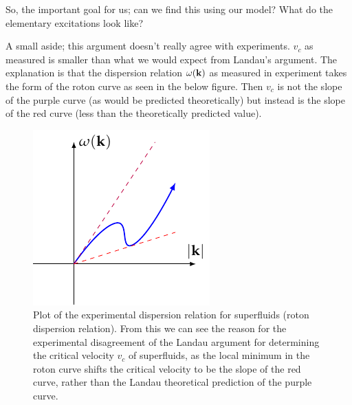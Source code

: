 So, the important goal for us; can we find this using our model? What do the elementary excitations look like?

A small aside; this argument doesn't really agree with experiments. $v_c$ as measured is smaller than what we would expect from Landau's argument. The explanation is that the dispersion relation $\omega(\mathbf{k})$ as measured in experiment takes the form of the roton curve as seen in the below figure. Then $v_c$ is not the slope of the purple curve (as would be predicted theoretically) but instead is the slope of the red curve (less than the theoretically predicted value).

\begin{figure}[htbp]
    \centering
    \includegraphics[]{Images/fig-rotoncurve.pdf}

    \caption{Plot of the experimental dispersion relation for superfluids (roton dispersion relation). From this we can see the reason for the experimental disagreement of the Landau argument for determining the critical velocity $v_c$ of superfluids, as the local minimum in the roton curve shifts the critical velocity to be the slope of the red curve, rather than the Landau theoretical prediction of the purple curve.}
    \label{fig-rotoncurve}
\end{figure}

